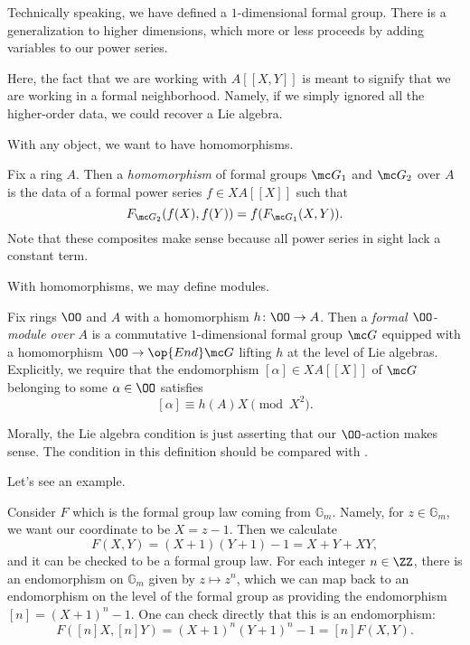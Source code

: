 \documentclass[../notes.tex]{subfiles}
\begin{document}
\begin{remark}
	Technically speaking, we have defined a $1$-dimensional formal group. There is a generalization to higher dimensions, which more or less proceeds by adding variables to our power series.
\end{remark}
Here, the fact that we are working with $A[[X,Y]]$ is meant to signify that we are working in a formal neighborhood. Namely, if we simply ignored all the higher-order data, we could recover a Lie algebra.

With any object, we want to have homomorphisms.
\begin{defihelper}[homomorphism] 
	Fix a ring $A$. Then a \textit{homomorphism} of formal groups $\mc G_1$ and $\mc G_2$ over $A$ is the data of a formal power series $f\in XA[[X]]$ such that
	\[F_{\mc G_2}(f(X),f(Y))=f(F_{\mc G_1}(X,Y)).\]
	Note that these composites make sense because all power series in sight lack a constant term.
\end{defihelper}
With homomorphisms, we may define modules.
\begin{definition}
	Fix rings $\OO$ and $A$ with a homomorphism $h\colon\OO\to A$. Then a \textit{formal $\OO$-module over $A$} is a commutative $1$-dimensional formal group $\mc G$ equipped with a homomorphism $\OO\to\op{End}\mc G$ lifting $h$ at the level of Lie algebras. Explicitly, we require that the endomorphism $[\alpha]\in XA[[X]]$ of $\mc G$ belonging to some $\alpha\in\OO$ satisfies
	\[[\alpha]\equiv h(A)X\pmod{X^2}.\]
\end{definition}
\begin{remark}
	Morally, the Lie algebra condition is just asserting that our $\OO$-action makes sense. The condition in this definition should be compared with .
\end{remark}
Let's see an example.
\begin{example}
	Consider $F$ which is the formal group law coming from $\mathbb G_m$. Namely, for $z\in\mathbb G_m$, we want our coordinate to be $X=z-1$. Then we calculate
	\[F(X,Y)=(X+1)(Y+1)-1=X+Y+XY,\]
	and it can be checked to be a formal group law. For each integer $n\in\ZZ$, there is an endomorphism on $\mathbb G_m$ given by $z\mapsto z^n$, which we can map back to an endomorphism on the level of the formal group as providing the endomorphism $[n]=(X+1)^n-1$. One can check directly that this is an endomorphism:
	\[F([n]X,[n]Y)=(X+1)^n(Y+1)^n-1=[n]F(X,Y).\]
\end{example}
\end{document}
